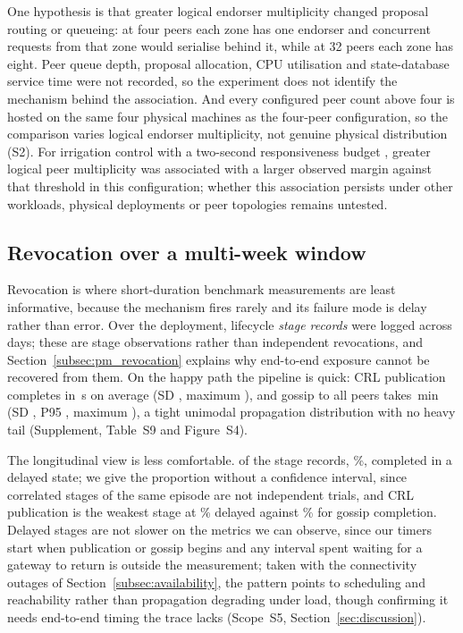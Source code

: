\documentclass[a4paper,fleqn]{cas-sc}
\begin{document}
One hypothesis is that greater logical endorser multiplicity changed
proposal routing or queueing: at four peers each zone has one endorser and
concurrent requests from that zone would serialise behind it, while at 32
peers each zone has eight. Peer queue depth, proposal allocation, CPU
utilisation and state-database service time were not recorded, so the
experiment does not identify the mechanism behind the association. And
every configured peer count above four is hosted on the same four physical
machines as the four-peer configuration, so the comparison varies logical
endorser multiplicity, not genuine physical distribution (S2). For
irrigation control with a two-second
responsiveness budget \cite{leacox2013wireless}, greater logical peer
multiplicity was associated with a larger observed margin against that
threshold in this configuration; whether this association persists under
other workloads, physical deployments or peer topologies remains
untested.

\subsection{Revocation over a multi-week window}
\label{subsec:revocation}

Revocation is where short-duration benchmark measurements are least
informative, because the mechanism fires rarely and its failure mode is
delay rather than error.
Over the deployment, \RevEvents{} lifecycle \emph{stage records} were
logged across \RevDays{} days; these are stage observations rather than
independent revocations, and Section~\ref{subsec:pm_revocation} explains
why end-to-end exposure cannot be recovered from them. On the happy path
the pipeline is quick: CRL publication completes in \RevPubMean\,s on
average (SD \RevPubSD, maximum \RevPubMax), and gossip to all peers takes
\RevGossipMean\,min (SD \RevGossipSD, P95 \RevGossipPNinetyFive, maximum
\RevGossipMax), a tight unimodal propagation distribution with no heavy
tail (Supplement, Table~S9 and Figure~S4).

The longitudinal view is less comfortable. \RevDelayed{} of the
\RevEvents{} stage records, \RevDelayedPct\%, completed in a delayed
state; we give the proportion without a confidence interval, since
correlated stages of the same episode are not independent trials, and CRL
publication is the weakest stage at \RevWorstTypePct\% delayed against
\RevBestTypePct\% for gossip completion. Delayed stages are not slower on
the metrics we can observe, since our timers start when publication or
gossip begins and any interval spent waiting for a gateway to return is
outside the measurement; taken with the connectivity outages of
Section~\ref{subsec:availability}, the pattern points to scheduling and
reachability rather than propagation degrading under load, though
confirming it needs end-to-end timing the trace lacks (Scope~S5,
Section~\ref{sec:discussion}).
\end{document}
